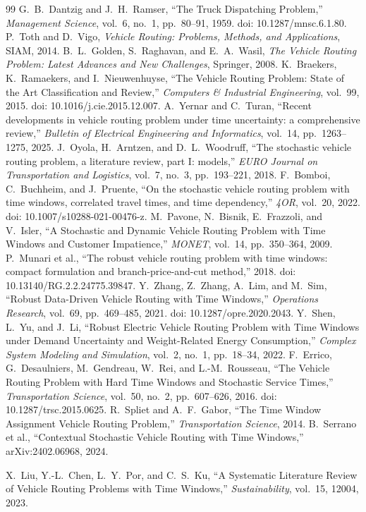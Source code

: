 \begin{thebibliography}{99}
G.~B.~Dantzig and J.~H.~Ramser, 
``The Truck Dispatching Problem,'' 
\textit{Management Science}, vol.~6, no.~1, pp.~80--91, 1959. 
doi: 10.1287/mnsc.6.1.80.
P.~Toth and D.~Vigo, 
\textit{Vehicle Routing: Problems, Methods, and Applications}, 
SIAM, 2014.
B.~L.~Golden, S.~Raghavan, and E.~A.~Wasil, 
\textit{The Vehicle Routing Problem: Latest Advances and New Challenges}, 
Springer, 2008.
K.~Braekers, K.~Ramaekers, and I.~Nieuwenhuyse,
``The Vehicle Routing Problem: State of the Art Classification and Review,''
\textit{Computers \& Industrial Engineering}, vol.~99, 2015.
doi: 10.1016/j.cie.2015.12.007.
A.~Yernar and C.~Turan, 
``Recent developments in vehicle routing problem under time uncertainty: a comprehensive review,'' 
\textit{Bulletin of Electrical Engineering and Informatics}, vol.~14, pp.~1263--1275, 2025.
J.~Oyola, H.~Arntzen, and D.~L.~Woodruff, 
``The stochastic vehicle routing problem, a literature review, part I: models,'' 
\textit{EURO Journal on Transportation and Logistics}, vol.~7, no.~3, pp.~193--221, 2018.
F.~Bomboi, C.~Buchheim, and J.~Pruente, 
``On the stochastic vehicle routing problem with time windows, correlated travel times, and time dependency,'' 
\textit{4OR}, vol.~20, 2022. 
doi: 10.1007/s10288-021-00476-z.
M.~Pavone, N.~Bisnik, E.~Frazzoli, and V.~Isler, 
``A Stochastic and Dynamic Vehicle Routing Problem with Time Windows and Customer Impatience,'' 
\textit{MONET}, vol.~14, pp.~350--364, 2009.
P.~Munari et al., 
``The robust vehicle routing problem with time windows: compact formulation and branch-price-and-cut method,'' 
2018. doi: 10.13140/RG.2.2.24775.39847.
Y.~Zhang, Z.~Zhang, A.~Lim, and M.~Sim,
``Robust Data-Driven Vehicle Routing with Time Windows,''
\textit{Operations Research}, vol.~69, pp.~469--485, 2021.
doi: 10.1287/opre.2020.2043.
Y.~Shen, L.~Yu, and J.~Li, 
``Robust Electric Vehicle Routing Problem with Time Windows under Demand Uncertainty and Weight-Related Energy Consumption,'' 
\textit{Complex System Modeling and Simulation}, vol.~2, no.~1, pp.~18--34, 2022.
F.~Errico, G.~Desaulniers, M.~Gendreau, W.~Rei, and L.-M.~Rousseau, 
``The Vehicle Routing Problem with Hard Time Windows and Stochastic Service Times,'' 
\textit{Transportation Science}, vol.~50, no.~2, pp.~607--626, 2016. 
doi: 10.1287/trsc.2015.0625.
R.~Spliet and A.~F.~Gabor, 
``The Time Window Assignment Vehicle Routing Problem,'' 
\textit{Transportation Science}, 2014.
B.~Serrano et al., 
``Contextual Stochastic Vehicle Routing with Time Windows,'' 
arXiv:2402.06968, 2024.

X.~Liu, Y.-L.~Chen, L.~Y.~Por, and C.~S.~Ku, 
``A Systematic Literature Review of Vehicle Routing Problems with Time Windows,'' 
\textit{Sustainability}, vol.~15, 12004, 2023.



\end{thebibliography}

